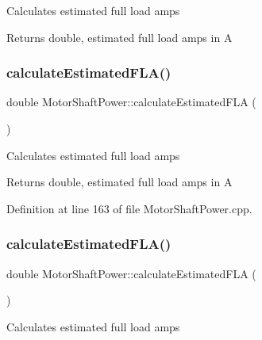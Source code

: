 Calculates estimated full load amps

\begin{DoxyReturn}{Returns}
double, estimated full load amps in A 
\end{DoxyReturn}
\mbox{\label{class_motor_shaft_power_a120b76be1b3b9fc3d67e37ecee0eb767}} 
\subsubsection{\texorpdfstring{calculate\+Estimated\+F\+L\+A()}{calculateEstimatedFLA()}\hspace{0.1cm}{\footnotesize\ttfamily [2/3]}}
{\footnotesize\ttfamily double Motor\+Shaft\+Power\+::calculate\+Estimated\+F\+LA (\begin{DoxyParamCaption}{ }\end{DoxyParamCaption})}

Calculates estimated full load amps

\begin{DoxyReturn}{Returns}
double, estimated full load amps in A 
\end{DoxyReturn}


Definition at line 163 of file Motor\+Shaft\+Power.\+cpp.

\mbox{\label{class_motor_shaft_power_a120b76be1b3b9fc3d67e37ecee0eb767}} 
\subsubsection{\texorpdfstring{calculate\+Estimated\+F\+L\+A()}{calculateEstimatedFLA()}\hspace{0.1cm}{\footnotesize\ttfamily [3/3]}}
{\footnotesize\ttfamily double Motor\+Shaft\+Power\+::calculate\+Estimated\+F\+LA (\begin{DoxyParamCaption}{ }\end{DoxyParamCaption})}

Calculates estimated full load amps

